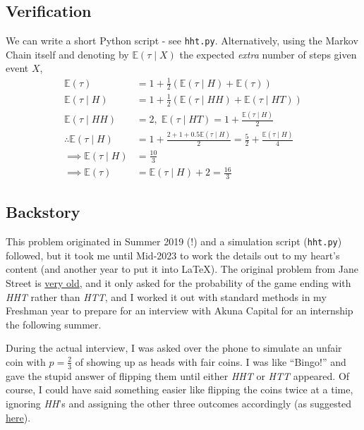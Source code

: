 \documentclass[11pt]{article}
\newcommand{\E}{\mathbb{E}}
\begin{document}
\subsection{Verification}
We can write a short Python script - see \texttt{hht.py}. Alternatively, using the Markov Chain itself and denoting by $\E(\tau\mid X)$ the expected \emph{extra} number of steps given event $X$,
\begin{align*}
\E(\tau) &= 1 + \frac{1}{2}\left(\E(\tau\mid H) + \E(\tau)\right) \\
\E(\tau\mid H) &= 1 + \frac{1}{2}\left(\E(\tau\mid HH) + \E(\tau\mid HT)\right) \\
\E(\tau\mid HH) &= 2, \;\E(\tau\mid HT) = 1 + \frac{\E(\tau\mid H)}{2} \\
\therefore \E(\tau\mid H) &= 1 + \frac{2 + 1 + 0.5\E(\tau\mid H)}{2} = \frac{5}{2} + \frac{\E(\tau\mid H)}{4} \\
\implies \E(\tau\mid H) &= \frac{10}{3} \\
\implies\E(\tau) &= \E(\tau\mid H) + 2 = \boxed{\frac{16}{3}}
\end{align*}

\subsection{Backstory}
This problem originated in Summer 2019 (!) and a simulation script (\texttt{hht.py}) followed, but it took me until Mid-2023 to work the details out to my heart's content (and another year to put it into \LaTeX). The original problem from Jane Street is \href{https://www.glassdoor.com/Interview/Flip-a-coin-until-either-HHT-or-HTT-appears-Is-one-more-likely-to-appear-first-If-so-which-one-and-with-what-probabili-QTN_46824.htm}{very old}, and it only asked for the probability of the game ending with \textit{HHT} rather than \textit{HTT}, and I worked it out with standard methods in my Freshman year to prepare for an interview with Akuna Capital for an internship the following summer.

During the actual interview, I was asked over the phone to simulate an unfair coin with $p = \frac{2}{3}$ of showing up as heads with fair coins. I was like ``Bingo!'' and gave the stupid answer of flipping them until either \textit{HHT} or \textit{HTT} appeared. Of course, I could have said something easier like flipping the coins twice at a time, ignoring \textit{HH}'s and assigning the other three outcomes accordingly (as suggested \href{https://mindyourdecisions.com/blog/2017/01/01/can-you-solve-it-use-a-coin-to-simulate-any-probability-sunday-puzzle/}{here}).
\end{document}
